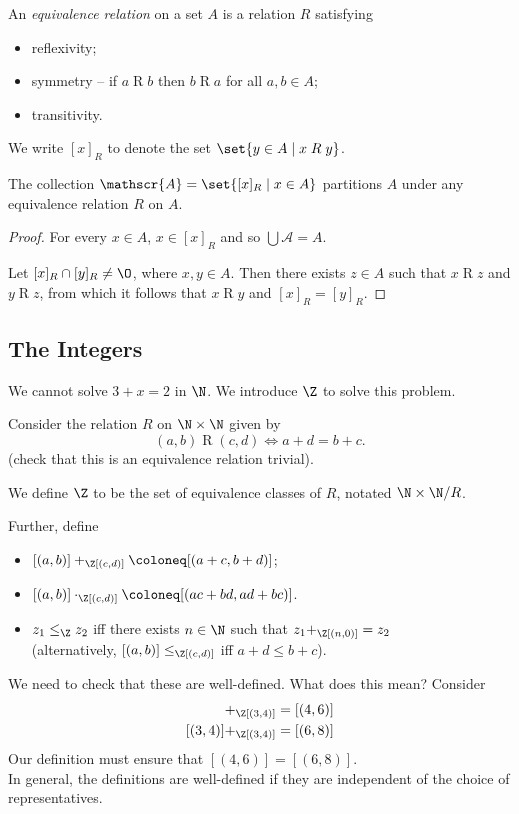 \begin{definition}[Equivalence] \label{def:relations:equivalence}
    An \emph{equivalence relation} on a set $A$ is a relation $R$ satisfying
    \begin{itemize}
        \item reflexivity;
        \item symmetry -- if $a \mathrel{R} b$ then $b \mathrel{R} a$ for all
        $a, b \in A$;
        \item transitivity.
    \end{itemize}
\end{definition}
\begin{notation}
    We write $[x]_R$ to denote the set $\set{y \in A \mid x \mathrel{R} y}$.
\end{notation}
\begin{proposition}
    The collection $\mathscr{A} = \set{[x]_R \mid x \in A}$ partitions $A$
    under any equivalence relation $R$ on $A$.
\end{proposition}
\begin{proof}
    For every $x \in A$, $x \in [x]_R$ and so $\bigcup \mathscr{A} = A$.

    Let $[x]_R \cap [y]_R \ne \O$, where $x, y \in A$.
    Then there exists $z \in A$ such that $x \mathrel{R} z$ and
    $y \mathrel{R} z$, from which it follows that $x \mathrel{R} y$ and
    $[x]_R = [y]_R$.
\end{proof}

\subsection{The Integers} \label{sec:integers}
We cannot solve $3 + x = 2$ in $\N$.
We introduce $\Z$ to solve this problem.

Consider the relation $R$ on $\N \times \N$ given by \[
    (a, b) \mathrel{R} (c, d) \iff a + d = b + c.
\] (check that this is an equivalence relation \textcolor{solved}{trivial}).
\begin{definition} \label{def:integers}
    We define $\Z$ to be the set of equivalence classes of $R$, notated
    $\N \times \N / R$.
\end{definition}
Further, define
\begin{itemize}
    \item $[(a, b)] +_\Z [(c, d)] \coloneq [(a + c, b + d)]$;
    \item $[(a, b)] \cdot_\Z [(c, d)] \coloneq [(ac + bd, ad + bc)]$.
    \item $z_1 \le_\Z z_2$ iff there exists $n \in \N$ such that
    $z_1 +_\Z [(n, 0)] = z_2$ \\
    (alternatively, $[(a, b)] \le_\Z [(c, d)]$ iff $a + d \le b + c$).
\end{itemize}
We need to check that these are well-defined.
What does this mean?
Consider \begin{align*}
    [(1, 2)] +_\Z [(3, 4)] &= [(4, 6)] \\
    [(3, 4)] +_\Z [(3, 4)] &= [(6, 8)]
\end{align*}
Our definition must ensure that $[(4, 6)] = [(6, 8)]$. \\
In general, the definitions are well-defined if they are independent of the
choice of representatives.
